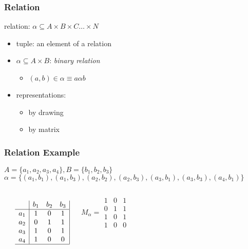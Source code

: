 \documentclass[dvipsnames]{beamer}
\begin{document}
\begin{frame}
  \frametitle{Relation}

  \begin{definition}
    \alert{relation}: $\alpha \subseteq A \times B \times C \dots \times N$
  \end{definition}

  \pause
  \begin{itemize}
    \item \alert{tuple}: an element of a relation

    \pause
    \medskip
    \item $\alpha \subseteq A \times B$: \emph{binary relation}
    \begin{itemize}
      \item $(a,b) \in \alpha \equiv a \alpha b$
    \end{itemize}

    \pause
    \medskip
    \item representations:
    \begin{itemize}
      \item by drawing
      \item by matrix
    \end{itemize}
  \end{itemize}
\end{frame}

\begin{frame}
  \frametitle{Relation Example}

  \begin{example}
    $A=\{a_1,a_2,a_3,a_4\}, B=\{b_1,b_2,b_3\}$\\
    $\alpha = \{(a_1,b_1),(a_1,b_3),(a_2,b_2),(a_2,b_3),
                (a_3,b_1),(a_3,b_3),(a_4,b_1)\}$

    \pause
    \medskip
    \begin{columns}
      \begin{center}
      \end{center}

      \[
        \begin{array}{c|ccc|}
              & b_1 & b_2 & b_3\\\hline
          a_1 &  1  &  0  &  1\\
          a_2 &  0  &  1  &  1\\
          a_3 &  1  &  0  &  1\\
          a_4 &  1  &  0  &  0\\\hline
        \end{array}
      \]

      \[
        M_\alpha =
          \begin{array}{|ccc|}
            1 & 0 & 1\\
            0 & 1 & 1\\
            1 & 0 & 1\\
            1 & 0 & 0
          \end{array}
      \]
    \end{columns}
  \end{example}
\end{frame}
\end{document}
